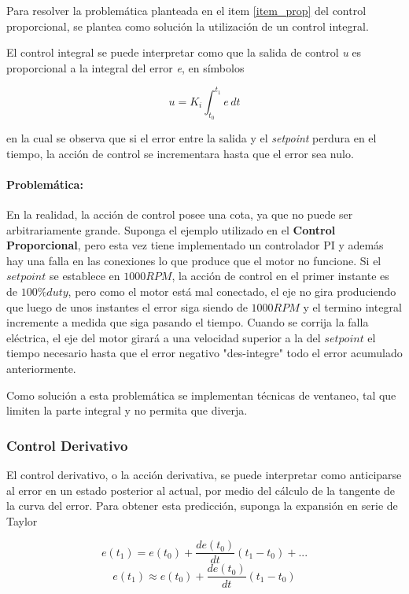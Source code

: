 \documentclass[10pt,conference,a4paper,onecolumn]{article}%
\begin{document}
Para resolver la problemática planteada en el item \ref{item_prop} del control proporcional, se plantea como solución la utilización de un control integral. 

El control integral se puede interpretar como que la salida de control \textit{u} es proporcional a la integral del error \textit{e}, en símbolos


\begin{equation}
u=K_i \int_{t_0}^{t_1} e \,dt 
\label{eq:control_integral}
\end{equation}


en la cual se observa que si el error entre la salida y el \textit{setpoint} perdura en el tiempo, la acción de control se incrementara hasta que el error sea nulo.

\paragraph{Problemática:} En la realidad, la acción de control posee una cota, ya que no puede ser arbitrariamente grande. 
Suponga el ejemplo utilizado en el \textbf{Control Proporcional}, pero esta vez tiene implementado un controlador PI y además hay una falla en las conexiones lo que produce que el motor no funcione. Si el $set point$ se establece en $1000RPM$, la acción de control en el primer instante es de $100\%duty$, pero como el motor está mal conectado, el eje no gira produciendo que luego de unos instantes el error siga siendo de  $1000RPM$ y el termino integral incremente a medida que siga pasando el tiempo. Cuando se corrija la falla eléctrica, el eje del motor girará a una velocidad superior a la del $set point$ el tiempo necesario hasta que el error negativo "des-integre" todo el error acumulado anteriormente.

Como solución a esta problemática se implementan técnicas de ventaneo, tal que limiten la parte integral y no permita que diverja.  



\subsubsection{Control Derivativo}
El control derivativo, o la acción derivativa, se puede interpretar como anticiparse al error en un estado posterior al actual, por medio del cálculo de la tangente de la curva del error. Para obtener esta predicción, suponga la expansión en serie de Taylor


\begin{equation*}
e(t_1)=e(t_0)+\frac{de(t_0)}{dt}(t_1-t_0)+... 
\end{equation*}
\begin{equation}
 e(t_1) \approx e(t_0)+\frac{de(t_0)}{dt}(t_1-t_0)
\end{equation}
\end{document}
